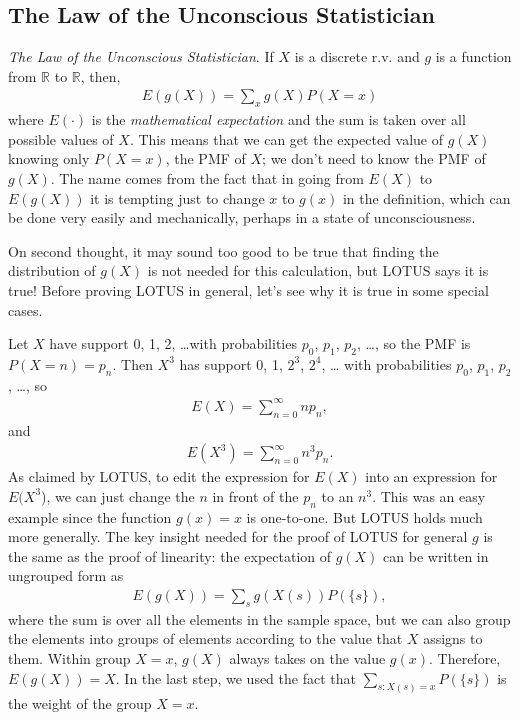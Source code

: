 \documentclass[11pt,a4paper]{article}
\begin{document}
\subsection{The Law of the Unconscious Statistician}

\emph{The Law of the Unconscious Statistician}. 
If \(X\) is a discrete r.v. and \(g\) is a function from \(\mathbb{R}\) to \(\mathbb{R}\), then,
\begin{align}
E(g(X)) = \sum_{x}{g(X)}P(X = x)
\end{align}
where \(E(\cdot)\) is the \emph{mathematical expectation} and­ the sum is
taken over all possible values of \(X\).
This means that we can get the expected value of \(g(X)\) knowing only \(P(X = x)\), 
the PMF of \(X\); 
we don't need to know the PMF of \(g(X)\). 
The name comes from the fact that in going from \(E(X)\) to
\(E(g(X))\) it is tempting just to change \(x\) to \(g(x)\) in the definition, 
which can be done very easily and mechanically, 
perhaps in a state of unconsciousness.

On second thought, 
it may sound too good to be true that finding the 
distribution of \(g(X)\) is not needed for this calculation, 
but LOTUS says it is true! 
Before proving LOTUS in general, 
let's see why it is true in some special cases.

Let \(X\) have support 0, 1, 2, \ldots with probabilities \(p_{0}\),
\(p_{1}\), \(p_{2}\), \ldots, so the PMF is \(P(X = n) = p_{n}\). 
Then \(X^{3}\) has support 0, 1, \(2^{3}\), \(2^{4}\), \ldots{} with
probabilities \(p_{0}\), \(p_{1}\), \(p_{2}\), \ldots, so
\begin{align}
E(X) = \sum_{n = 0}^{\infty}{np_{n}},
\end{align}
and
\begin{align}
E\left(X^{3}\right) = \sum_{n = 0}^{\infty}{n^{3}p_{n}}.
\end{align}
As claimed by LOTUS, 
to edit the expression for \(E(X)\) into an expression for \(E(X^{3}\)), 
we can just change the \(n\) in front of the \(p_{n}\) to an \(n^{3}\). 
This was an easy example since the function \(g(x) = x\) is one-to-one. 
But LOTUS holds much more generally. 
The key insight needed for the proof of LOTUS for general
\(g\) is the same as the proof of linearity: the expectation of \(g(X)\)
can be written in ungrouped form as
\begin{align}
E(g(X)) = \sum_{s}{g(X(s))P(\{ s\})},
\end{align}
where the sum is over all the elements in the sample space, 
but we can also group the elements into groups of elements according to the value
that \(X\) assigns to them. 
Within group \(X = x\), 
\(g(X)\) always takes on the value \(g(x)\). 
Therefore, \(E(g(X)) = X\).
In the last step, we used the fact that
\(\sum_{s:X(s) = x}{P\left(\{s\} \right)}\) is the
weight of the group \(X = x\).
\end{document}
